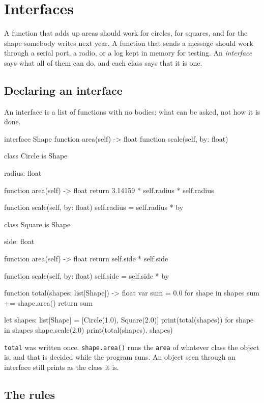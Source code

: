 \chapter{Interfaces}\label{ch-interfaces}

A function that adds up areas should work for circles, for squares,
and for the shape somebody writes next year. A function that sends a
message should work through a serial port, a radio, or a log kept in
memory for testing. An \emph{interface} says what all of them can do,
and each class says that it is one.

\section{Declaring an interface}

An interface is a list of functions with no bodies: what can be asked,
not how it is done.

\begin{zeno}
interface Shape {
    function area(self) -> float
    function scale(self, by: float)
}

class Circle is Shape {
    radius: float

    function area(self) -> float {
        return 3.14159 * self.radius * self.radius
    }

    function scale(self, by: float) {
        self.radius = self.radius * by
    }
}

class Square is Shape {
    side: float

    function area(self) -> float {
        return self.side * self.side
    }

    function scale(self, by: float) {
        self.side = self.side * by
    }
}

function total(shapes: list[Shape]) -> float {
    var sum = 0.0
    for shape in shapes {
        sum += shape.area()
    }
    return sum
}

let shapes: list[Shape] = [Circle(1.0), Square(2.0)]
print(total(shapes))
for shape in shapes {
    shape.scale(2.0)
}
print(total(shapes), shapes)
\end{zeno}

\verb|total| was written once. \verb|shape.area()| runs the
\verb|area| of whatever class the object is, and that is decided while
the program runs. An object seen through an interface still prints as
the class it is.

\section{The rules}

